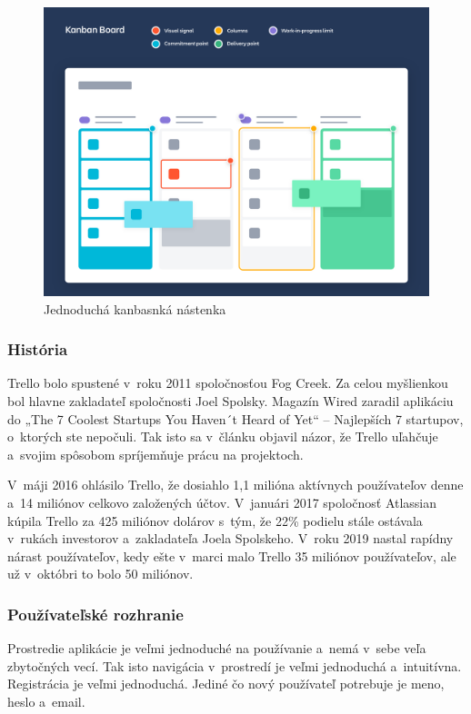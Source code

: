 \begin{figure}[H]
    \centering
    \includegraphics[scale=0.25]{img/obr4.png}
    \caption{Jednoduchá kanbasnká nástenka\cite{kaban_board}}
    \label{fig:kab-nas}
\end{figure}

\subsubsection{História}
\indent Trello bolo spustené v roku 2011 spoločnosťou Fog Creek. Za celou myšlienkou bol hlavne zakladateľ spoločnosti Joel Spolsky. Magazín Wired zaradil aplikáciu do „The 7 Coolest Startups You Haven´t Heard of Yet“ – Najlepších 7 startupov, o ktorých ste nepočuli. Tak isto sa v článku objavil názor, že Trello uľahčuje a svojim spôsobom spríjemňuje prácu na projektoch. 

\indent V máji 2016 ohlásilo Trello, že dosiahlo 1,1 milióna aktívnych používateľov denne a 14 miliónov celkovo založených účtov. V januári 2017 spoločnosť Atlassian kúpila Trello za 425 miliónov dolárov s tým, že 22\% podielu stále ostávala v rukách investorov a zakladateľa Joela Spolskeho. V roku 2019 nastal rapídny nárast používateľov, kedy ešte v marci malo Trello 35 miliónov používateľov, ale už v októbri to bolo 50 miliónov\cite{trello}.
\subsubsection{Používateľské rozhranie}
\indent Prostredie aplikácie je veľmi jednoduché na používanie a nemá v sebe veľa zbytočných vecí. Tak isto navigácia v prostredí je veľmi jednoduchá a intuitívna. Registrácia je veľmi jednoduchá. Jediné čo nový používateľ potrebuje je meno, heslo a email. 

